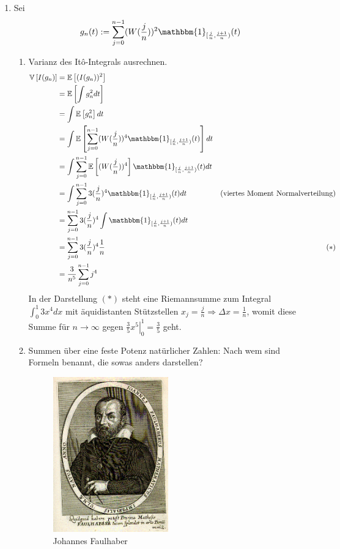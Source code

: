 \documentclass[a4paper,11pt,notitlepage,fullpage]{article}
\newcommand{\Ee}[1]{\mathbb E\left[#1\right]}
\newcommand{\Vv}[1]{\mathbb V\left[#1\right]}
\newcommand{\indd}[1]{\mathbbm{1}_{#1}}
\begin{document}
\begin{enumerate}
\item Sei
$$g_n(t) := \sum_{j=0}^{n-1} (W(\frac{j}{n}))^2 \indd{[\frac{j}{n}, \frac{j+1}{n})}(t)$$
\begin{enumerate}
\item Varianz des Itô-Integrals ausrechnen.
\begin{align*}
\Vv{I(g_n)} &= \Ee{(I(g_n))^2}\\
&=\Ee{\int g_n^2 dt}\\
&= \int \Ee{g_n^2} dt\\
&= \int \Ee{\sum_{j=0}^{n-1} (W(\frac{j}{n}))^4 \indd{[\frac{j}{n}, \frac{j+1}{n})}(t)} dt\\
&= \int \sum_{j=0}^{n-1} \Ee{(W(\frac{j}{n}))^4} \indd{[\frac{j}{n}, \frac{j+1}{n})}(t) dt\\
&= \int \sum_{j=0}^{n-1} 3(\frac{j}{n})^4 \indd{[\frac{j}{n}, \frac{j+1}{n})}(t) dt &\text{(viertes Moment Normalverteilung)}\\
&= \sum_{j=0}^{n-1} 3(\frac{j}{n})^4 \int \indd{[\frac{j}{n}, \frac{j+1}{n})}(t) dt\\
&= \sum_{j=0}^{n-1} 3(\frac{j}{n})^4 \frac{1}{n} &(*)\\
&= \frac{3}{n^5} \sum_{j=0}^{n-1} j^4 \\
\end{align*}
In der Darstellung $(*)$ steht eine Riemannsumme zum Integral $\int_0^1 3x^4 dx$ mit äquidistanten Stützstellen $x_j = \frac{j}{n} \Rightarrow \Delta x = \frac{1}{n}$, womit diese Summe für $n\rightarrow \infty$ gegen $\left. \frac{3}{5}x^5\right|_0^1 = \frac{3}{5}$ geht.

\item Summen über eine feste Potenz natürlicher Zahlen: Nach wem sind Formeln benannt, die sowas anders darstellen?

\begin{figure}[h!]
\centering
\includegraphics[width=0.5\textwidth]{gfx/Ioannes-Faulhaberus-Mathematicus-Imperialis-Ulmae-Natus.png}
\caption{Johannes Faulhaber}
\end{figure}


\end{enumerate}
\end{enumerate}
\end{document}

